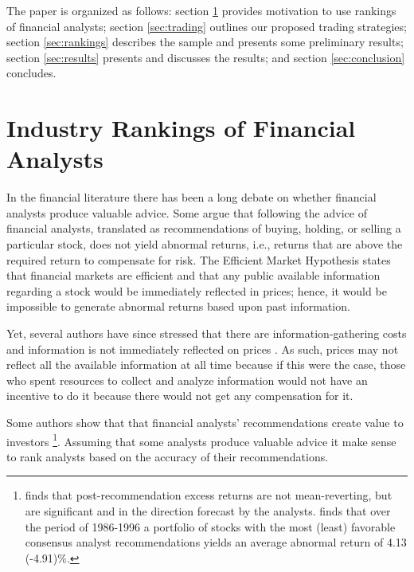 \documentclass{article}
\begin{document}
The paper is organized as follows: section \ref{sec:ranking} provides motivation to use rankings of financial analysts; section \ref{sec:trading} outlines our proposed  trading strategies; section \ref{sec:rankings} describes the sample and presents some preliminary results; section \ref{sec:results} presents and discusses the results; and section \ref{sec:conclusion} concludes.

\section{Industry Rankings of Financial Analysts}
\label{sec:ranking}

In the financial literature there has been a long debate on whether financial analysts produce valuable  advice. Some argue that following the advice of financial analysts,  translated as recommendations of buying, holding, or selling a particular stock, does not yield  abnormal returns, i.e.,  returns that are above the required return to compensate for risk. The Efficient Market Hypothesis \citep{fama1970ecm} states that financial markets are efficient and that any public available information  regarding a stock would be immediately reflected in prices; hence, it would be  impossible to generate abnormal returns based upon past information.

Yet, several authors have since stressed that  there are information-gathering costs and information is not immediately reflected on prices  \citep{grossman1980iie}. As such, prices may not  reflect all the available information at all time because if this were the case, those who spent resources to collect and analyze   information would not have an incentive to do it because there would not get any compensation for it.



Some authors show that that financial analysts' recommendations create value to investors \citep{womack1996,barber2001}\footnote{\cite{womack1996} finds that  post-recommendation excess returns are not mean-reverting, but are significant and in the direction forecast by the analysts. \cite{barber2001} finds that over the period of 1986-1996 a portfolio of stocks with the most (least) favorable consensus analyst recommendations yields an average abnormal return of 4.13 (-4.91)\%.}. Assuming that some analysts produce valuable advice it make sense to rank analysts based on the accuracy of their recommendations. 
\end{document}

